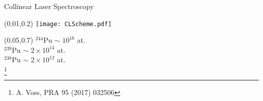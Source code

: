 \documentclass[10pt,aspectratio=169]{beamer}
\begin{document}
\begin{frame}{Collinear Laser Spectroscopy}
	\begin{textblock*}{0.4\paperwidth}(0.01\paperwidth,0.2\paperheight)
		\texttt{[image: CLScheme.pdf]}
	\end{textblock*}
	\begin{textblock*}{0.3\paperwidth}(0.05\paperwidth,0.7\paperheight)
		$^{244}$Pu $\sim$ $10^{16}$ at.\\
		$^{239}$Pu $\sim$ $2\times10^{14}$ at.\\
		$^{238}$Pu $\sim$ $2\times10^{12}$ at.\\
		\footnote{A. Voss, PRA 95 (2017) 032506}
	\end{textblock*}
\end{frame}
\end{document}
